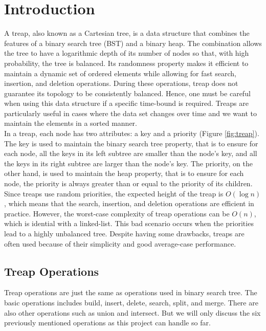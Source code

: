 \newpage
\section{Introduction}
\setcounter{subsection}{0}


\noindent A treap, also known as a Cartesian tree, is a data structure that combines the features of a binary search tree (BST) and a binary heap. The combination allows the tree to have a logarithmic depth of its number of nodes so that, with high probability, the tree is balanced. Its randomness property makes it efficient to maintain a dynamic set of ordered elements while allowing for fast search, insertion, and deletion operations. During these operations, treap does not guarantee its topology to be consistently balanced. Hence, one must be careful when using this data structure if a specific time-bound is required. Treaps are particularly useful in cases where the data set changes over time and we want to maintain the elements in a sorted manner.\\

In a treap, each node has two attributes: a key and a priority (Figure \ref*{fig:treap}). The key is used to maintain the binary search tree property, that is to ensure for each node, all the keys in its left subtree are smaller than the node's key, and all the keys in its right subtree are larger than the node's key. The priority, on the other hand, is used to maintain the heap property, that is to ensure for each node, the priority is always greater than or equal to the priority of its children.\\

Since treaps use random priorities, the expected height of the treap is $O(\log n)$, which means that the search, insertion, and deletion operations are efficient in practice. However, the worst-case complexity of treap operations can be $O(n)$, which is idential with a linked-list. This bad scenario occurs when the priorities lead to a highly unbalanced tree. Despite having some drawbacks, treaps are often used because of their simplicity and good average-case performance.\\

\subsection{Treap Operations}
Treap operations are just the same as operations used in binary search tree. The basic operations includes build, insert, delete, search, split, and merge. There are also other operations such as union and intersect. But we will only discuss the six previously mentioned operations as this project can handle so far.\\


